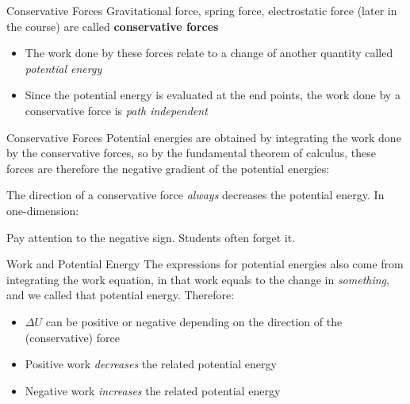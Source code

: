 \documentclass[12pt,compress,aspectratio=169]{beamer}
\newcommand{\eq}[2]{\vspace{#1}{\Large\begin{displaymath}#2\end{displaymath}}}
\begin{document}
\begin{frame}{Conservative Forces}
  Gravitational force, spring force, electrostatic force (later in the
  course) are called \textbf{conservative forces}
  \begin{itemize}
  \item The work done by these forces relate to a change of another quantity
    called \emph{potential energy}
  \item Since the potential energy is evaluated at the end points, the work
    done by a conservative force is \emph{path independent}
  \end{itemize}
\end{frame}



\begin{frame}{Conservative Forces}
  Potential energies are obtained by integrating the work done by the
  conservative forces, so by the fundamental theorem of calculus, these forces
  are therefore the negative gradient of the potential energies:

  \eq{-.2in}{
    \bm{F}=-\nabla U=
    -\diffp Ux\bm{\hat{\imath}}-\diffp Uy\bm{\hat{\jmath}}-\diffp Uz\hat{\bm{k}}
  }

  The direction of a conservative force \emph{always} decreases the potential
  energy. In one-dimension:

  \eq{-.2in}{
    \boxed{
      F=-\diff Ux
    }
  }

  Pay attention to the negative sign. Students often forget it.
\end{frame}




\begin{frame}{Work and Potential Energy}
  The expressions for potential energies also come from integrating the work
  equation, in that work equals to the change in \emph{something}, and we
  called that potential energy. Therefore:

  \eq{-.2in}{
    \boxed{
      W_c=-\Delta U
    }
  }
  \begin{itemize}
  \item\vspace{-.15in}$\Delta U$ can be positive or negative depending on the
    direction of the (conservative) force
  \item Positive work \emph{decreases} the related potential energy
  \item Negative work \emph{increases} the related potential energy
  \end{itemize}
\end{frame}
\end{document}
